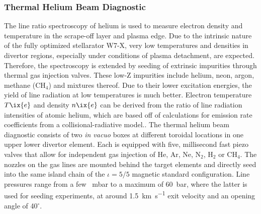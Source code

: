        \subsubsection*{Thermal Helium Beam Diagnostic}%
%
            The line ratio spectroscopy of helium is used to measure electron density and temperature in the scrape-off layer and plasma edge. Due to the intrinsic nature of the fully optimized stellarator W7-X, very low temperatures and densities in divertor regions, especially under conditions of plasma detachment, are expected. Therefore, the spectroscopy is extended by seeding of extrinsic impurities through thermal gas injection valves. These low-Z impurities include helium, neon, argon, methane (CH$_{4}$) and mixtures thereof. Due to their lower excitation energies, the yield of line radiation at low temperatures is much better\cite{Barbui2016}. Electron temperature $T\ix{e}$ and density $n\ix{e}$ can be derived from the ratio of line radiation intensities of atomic helium, which are based off of calculations for emission rate coefficients from a collisional-radiative model.\cite{Denkelmann1999,Krychowiak2011}. The thermal helium beam diagnostic consists of two \textit{in vacuo} boxes at different toroidal locations in one upper lower divertor element. Each is equipped with five, millisecond fast piezo valves that allow for independent gas injection of He, Ar, Ne, N$_{2}$, H$_{2}$ or CH$_{4}$. The nozzles on the gas lines are mounted behind the target elements and directly seed into the same island chain of the $\iota=5/5$ magnetic standard configuration. Line pressures range from a few \SI{}{\milli\bar} to a maximum of \SI{60}{\bar}, where the latter is used for seeding experiments, at around \SI{1.5}{\kilo\meter\per\second} exit velocity and an opening angle of 40$^{\circ}$.\cite{Krychowiak2011,Barbui2016}\\%
%
